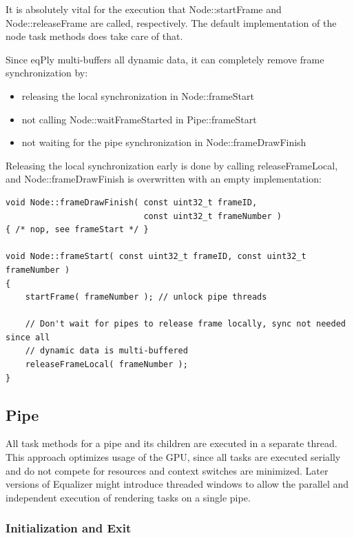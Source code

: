 \documentclass[10pt,a4]{scrartcl}
\begin{document}
It is absolutely vital for the execution that \textsf{Node::start\-Fra\-me}
and \textsf{Node::release\-Fra\-me} are called, respectively. The default
implementation of the node task methods does take care of that.

Since \textsf{eqPly} multi-buffers all dynamic data, it can completely
remove frame synchronization by:

\begin{itemize}
\item releasing the local synchronization in \textsf{Node::frameStart}
\item not calling \textsf{Node::waitFrameStarted} in
  \textsf{Pipe::frameStart}
\item not waiting for the pipe synchronization in \textsf{Node::frameDrawFinish}
\end{itemize}

Releasing the local synchronization early is done by calling
\textsf{releaseFrameLocal}, and \textsf{Node::frameDrawFinish} is
overwritten with an empty implementation:

{\footnotesize\begin{lstlisting}
void Node::frameDrawFinish( const uint32_t frameID,
                            const uint32_t frameNumber )
{ /* nop, see frameStart */ }

void Node::frameStart( const uint32_t frameID, const uint32_t frameNumber )
{
    startFrame( frameNumber ); // unlock pipe threads
    
    // Don't wait for pipes to release frame locally, sync not needed since all
    // dynamic data is multi-buffered
    releaseFrameLocal( frameNumber );
}
\end{lstlisting}}


\subsection{Pipe}

All task methods for a pipe and its children are executed in a separate
thread. This approach optimizes usage of the GPU, since all
tasks are executed serially and do not compete for resources and
context switches are minimized. Later versions of Equalizer might
introduce threaded windows to allow the parallel and independent
execution of rendering tasks on a single pipe.

\subsubsection{Initialization and Exit}
\end{document}
